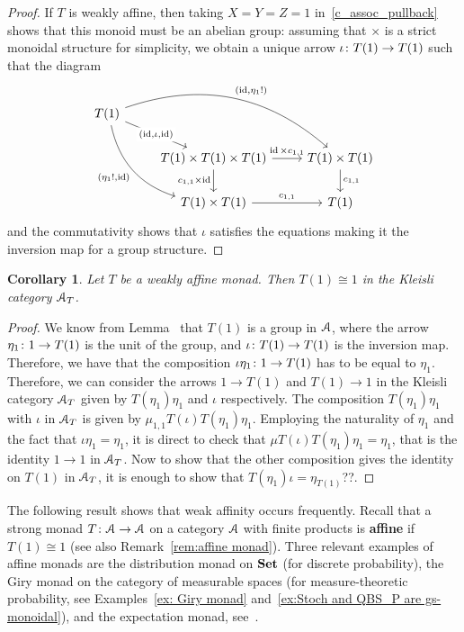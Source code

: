 \documentclass[a4paper,UKenglish,numberwithinsect,cleveref, autoref, thm-restate]{lipics-v2021}
\theoremstyle{plain} %
\newtheorem{mycorollary}[mytheorem]{Corollary}
\theoremstyle{definition} %
\begin{document}
\begin{proof}
	If $T$ is weakly affine, then taking $X = Y = Z = 1$ in~\eqref{c_assoc_pullback} shows that this monoid must be an abelian group:
	assuming that $\times$ is a strict monoidal structure for simplicity, we obtain a unique arrow $\freccia{T(1)}{\iota}{T(1)}$ such that the diagram
	\[
		\begin{tikzcd}
			T(1) \ar{dr}[description]{(\id,\iota,\id)} \ar[bend left]{drr}{(\id,\eta_1 !)} \ar[bend right,swap]{ddr}{(\eta_1 !,\id)} \\
			&	T(1) \times T(1) \times T(1) \ar{r}{\id \times c_{1,1}} \ar[swap]{d}{c_{1,1} \times \id}	& T(1) \times T(1) \ar{d}{c_{1,1}}	\\
			&	T(1) \times T(1) \ar{r}{c_{1,1}}								& T(1)
		\end{tikzcd}
	\]
	and the commutativity shows that $\iota$ satisfies the equations making it the inversion map for a group structure.
\end{proof}
\begin{mycorollary}
Let $T$ be a weakly affine monad. Then $T(1)\cong 1$ in the Kleisli category $\mA_T$.
\end{mycorollary}
\begin{proof}
We know from Lemma~\label{lem:T1_group} that $T(1)$ is a group in $\mA$, where the arrow $\freccia{1}{\eta_1}{T(1)}$ is the unit of the group, and $\freccia{T(1)}{\iota}{T(1)}$ is the inversion map. Therefore, we have that the composition $\freccia{1}{\iota\eta_1}{T(1)}$ has to be equal to $\eta_1$. Therefore, we can consider the arrows $1\to T(1)$ and $T(1)\to 1$ in the Kleisli category $\mA_T$ given by $T(\eta_1)\eta_1$ and $\iota$ respectively. The composition $T(\eta_1)\eta_1$ with $\iota$ in $\mA_T$ is given by $\mu_{1,1}T(\iota)T(\eta_1)\eta_1$. Employing the naturality of $\eta_1$ and the fact that $\iota\eta_1=\eta_1$, it is direct to check that $\mu T(\iota)T(\eta_1)\eta_1=\eta_1$, that is the identity $1\to 1$ in $\mA_T$. Now to show that the other composition gives the identity on $T(1)$ in $\mA_T$, it is enough to show that $T(\eta_1)\iota=\eta_{T(1)}$??.


\end{proof}
The following result shows that weak affinity occurs frequently. 
Recall that a strong monad $\freccia{\mA}{T}{\mA}$ on a category $\mA$ with finite products is \textbf{affine} if $T(1)\cong 1$ (see also Remark~\ref{rem:affine monad}). Three relevant examples of affine monads are the distribution monad on $\Set$ (for discrete probability), the Giry monad on the category of measurable spaces (for measure-theoretic probability, see Examples~\ref{ex: Giry monad} and~\ref{ex:Stoch and QBS_P are gs-monoidal}), and the expectation monad, see~\cite{Jacobs16}.
\end{document}
